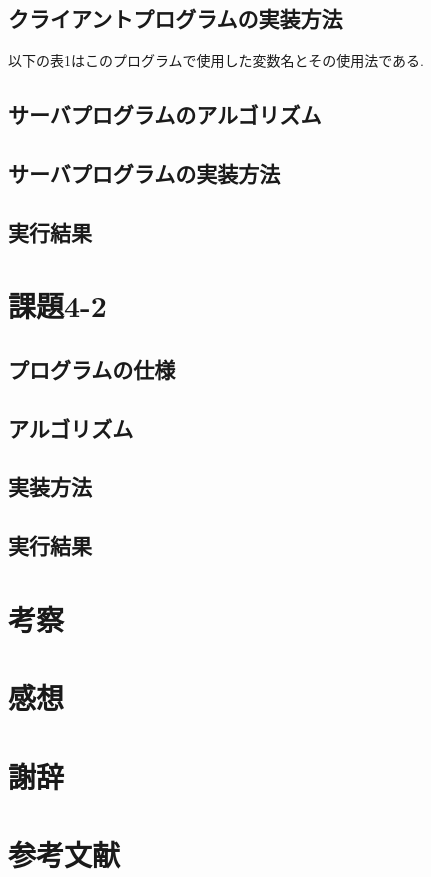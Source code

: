 \documentclass[dvipdfmx]{jarticle}
\begin{document}
\subsection{クライアントプログラムの実装方法}
以下の表1はこのプログラムで使用した変数名とその使用法である.
\subsection{サーバプログラムのアルゴリズム}
\subsection{サーバプログラムの実装方法}
\subsection{実行結果}
\section{課題4-2}
\subsection{プログラムの仕様}
\subsection{アルゴリズム}
\subsection{実装方法}
\subsection{実行結果}
\section{考察}
\section{感想}
\section{謝辞}
\section{参考文献}
\end{document}
